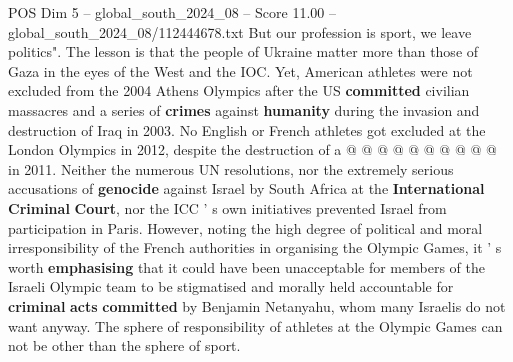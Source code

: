 \begin{textsample}{POS Dim 5 – global\_south\_2024\_08 – Score 11.00 – global\_south\_2024\_08/112444678.txt}
But our profession is sport, we leave politics".
The lesson is that the people of Ukraine matter more than those of Gaza in the eyes of the West and the IOC.
Yet, American athletes were not excluded from the 2004 Athens Olympics after the US \textbf{committed} civilian massacres and a series of \textbf{crimes} against \textbf{humanity} during the invasion and destruction of Iraq in 2003.
No English or French athletes got excluded at the London Olympics in 2012, despite the destruction of a @ @ @ @ @ @ @ @ @ @ in 2011.
Neither the numerous UN resolutions, nor the extremely serious accusations of \textbf{genocide} against Israel by South Africa at the \textbf{International} \textbf{Criminal} \textbf{Court}, nor the ICC ' s own initiatives prevented Israel from participation in Paris.
However, noting the high degree of political and moral irresponsibility of the French authorities in organising the Olympic Games, it ' s worth \textbf{emphasising} that it could have been unacceptable for members of the Israeli Olympic team to be stigmatised and morally held accountable for \textbf{criminal} \textbf{acts} \textbf{committed} by Benjamin Netanyahu, whom many Israelis do not want anyway.
The sphere of responsibility of athletes at the Olympic Games can not be other than the sphere of sport.

\end{textsample}
